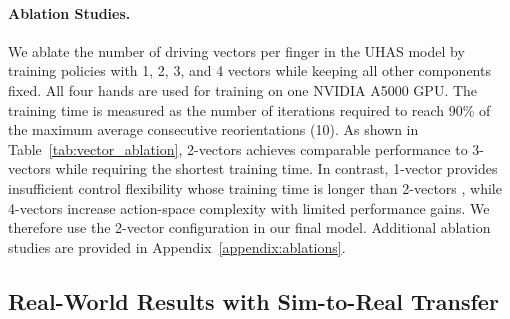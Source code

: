 \paragraph{Ablation Studies.}
We ablate the number of driving vectors per finger in the UHAS model by training policies with 1, 2, 3, and 4 vectors while keeping all other components fixed. All four hands are used for training on one NVIDIA A5000 GPU. The training time is measured as the number of iterations required to reach 90\% of the maximum average consecutive reorientations (10). As shown in Table~\ref{tab:vector_ablation}, 2-vectors achieves comparable performance to 3-vectors while requiring the shortest training time. In contrast, 1-vector provides insufficient control flexibility whose training time is longer than 2-vectors , while 4-vectors increase action-space complexity with limited performance gains. We therefore use the 2-vector configuration in our final model. Additional ablation studies are provided in Appendix~\ref{appendix:ablations}.





\subsection{Real-World Results with Sim-to-Real Transfer}
\label{subsec:real_world}


